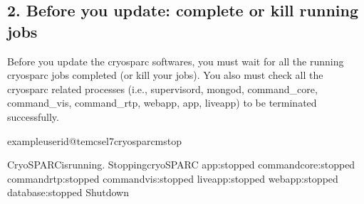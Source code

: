 \documentclass[a4paper,10pt,english]{sphinxmanual}
\begin{document}
\subsection{2. Before you update: complete or kill running jobs}
\label{\detokenize{faq:before-you-update-complete-or-kill-running-jobs}}
\sphinxAtStartPar
Before you update the cryosparc softwares, you must wait for all the running cryosparc jobs completed (or kill your jobs).
You also must check all the cryosparc related processes (i.e., supervisord, mongod, command\_core, command\_vis, command\_rtp, webapp, app, liveapp) to be terminated successfully.

\begin{sphinxVerbatim}[commandchars=\\\{\}]
exampleuserid@tem\PYGZhy{}cs\PYGZhy{}el7\PYGZdl{}\PYGZgt{}cryosparcmstop

CryoSPARCisrunning.
StoppingcryoSPARC
app:stopped
command\PYGZus{}core:stopped
command\PYGZus{}rtp:stopped
command\PYGZus{}vis:stopped
liveapp:stopped
webapp:stopped
database:stopped
Shutdown


\end{sphinxVerbatim}
\end{document}
